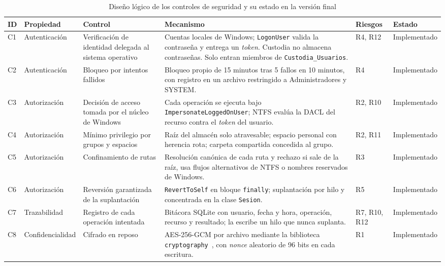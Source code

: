 \documentclass[conference]{IEEEtran}
\renewcommand{\arraystretch}{1.15}
\begin{document}
\begin{table}[!t]
\caption{Diseño lógico de los controles de seguridad y su estado en la versión final}
\label{tab:controles}
\centering
\footnotesize
\renewcommand{\arraystretch}{0.94}
\setlength{\tabcolsep}{3pt}
\begin{tabular}{|l|p{1.95cm}|p{3.4cm}|p{6.6cm}|p{1.4cm}|p{2.15cm}|}
\hline
\textbf{ID} & \textbf{Propiedad} & \textbf{Control} & \textbf{Mecanismo} & \textbf{Riesgos} & \textbf{Estado} \\
\hline
C1 & Autenticación & Verificación de identidad delegada al sistema operativo & Cuentas locales de Windows; \texttt{LogonUser} valida la contraseña y entrega un \textit{token}. Custodia no almacena contraseñas. Solo entran miembros de \texttt{Custodia\_Usuarios}. & R4, R12 & Implementado \\
\hline
C2 & Autenticación & Bloqueo por intentos fallidos & Bloqueo propio de 15 minutos tras 5 fallos en 10 minutos, con registro en un archivo restringido a Administradores y SYSTEM. & R4 & Implementado \\
\hline
C3 & Autorización & Decisión de acceso tomada por el núcleo de Windows & Cada operación se ejecuta bajo \texttt{ImpersonateLoggedOnUser}; NTFS evalúa la DACL del recurso contra el \textit{token} del usuario. & R2, R10 & Implementado \\
\hline
C4 & Autorización & Mínimo privilegio por grupos y espacios & Raíz del almacén solo atravesable; espacio personal con herencia rota; carpeta compartida concedida al grupo. & R2, R11 & Implementado \\
\hline
C5 & Autorización & Confinamiento de rutas & Resolución canónica de cada ruta y rechazo si sale de la raíz, usa flujos alternativos de NTFS o nombres reservados de Windows. & R3 & Implementado \\
\hline
C6 & Autorización & Reversión garantizada de la suplantación & \texttt{RevertToSelf} en bloque \texttt{finally}; suplantación por hilo y concentrada en la clase \texttt{Sesion}. & R5 & Implementado \\
\hline
C7 & Trazabilidad & Registro de cada operación intentada & Bitácora SQLite con usuario, fecha y hora, operación, recurso y resultado; la escribe un hilo que nunca suplanta. & R7, R10, R12 & Implementado \\
\hline
C8 & Confidencialidad & Cifrado en reposo & AES-256-GCM por archivo mediante la biblioteca \texttt{cryptography}~\cite{pyca}, con \textit{nonce} aleatorio de 96 bits en cada escritura. & R1 & Implementado \\

\end{tabular}
\end{table}
\end{document}
